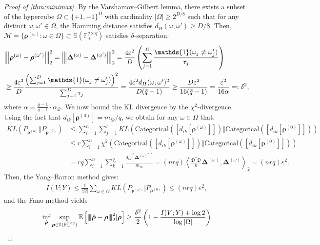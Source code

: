 \documentclass[noinfoline]{imsart}\setcounter{tocdepth}{2}
\renewcommand{\b}[1]{\mathbb{#1}} %
\newcommand{\f}[1]{\mathfrak{#1}} %
\renewcommand{\c}[1]{\mathcal{#1}} %
\newcommand{\ds}[1]{\mathds{#1}} %
\newcommand{\mb}[1]{\boldsymbol{#1}} %
\newcommand{\vertiii}[1]{{\left\vert\kern-0.25ex\left\vert\kern-0.25ex\left\vert #1 
    \right\vert\kern-0.25ex\right\vert\kern-0.25ex\right\vert}} %
\newcommand{\innpr}[2]{{\left\langle {#1},{#2}\right\rangle}} %
\theoremstyle{plain}
\begin{document}
\begin{appendix}
\begin{proof}[Proof of \cref{thm:minimax}]
By the Varshamov--Gilbert lemma, there exists a subset of the hypercube $\Omega \subset \{+1, -1\}^{D}$ with cardinality $|\Omega| \ge 2^{D/8}$ such that for any distinct $\omega, \omega' \in \Omega$, the Hamming distance satisfies $d_{H}(\omega, \omega') \ge D/8$. Then, $\c{M} = \{\mb{\rho}^{(\omega)} : \omega \in \Omega \} \subset \b{S}(\b{F}_{+}^{q \times q})$ satisfies $\delta$-separation:
\begin{align*}
    &\vertiii{\mb{\rho}^{(\omega)} - \mb{\rho}^{(\omega')}}_{2}^{2} = \vertiii{\mb{\Delta}^{(\omega)} - \mb{\Delta}^{(\omega')}}_{2}^{2} = \frac{4 \varepsilon^{2}}{D} \left( \sum_{j=1}^{D} \frac{\ds{1}(\omega_{j} \neq \omega_{j}')}{ \tau_{j}} \right) \\
    &\ge \frac{4 \varepsilon^{2}}{D} \frac{ \left( \sum_{j=1}^{D} \ds{1}(\omega_{j} \neq \omega_{j}') \right)^{2}}{\sum_{j=1}^{D} \tau_{j}} = \frac{4 \varepsilon^2 d_{H}(\omega, \omega')^{2}}{D (\bar{q}-1)} \ge  \frac{D \varepsilon^2}{16 (\bar{q}-1)} = \frac{\varepsilon^2}{16 \alpha} =: \delta^{2},
\end{align*}
where $\alpha = \frac{\bar{q} - 1}{q-1} \cdot \alpha_{\c{Q}}$.
We now bound the KL divergence by the $\chi^{2}$-divergence. Using the fact that $d_{ik}[\mb{\rho}^{(0)}] = m_{ik} / q$, we obtain for any $\omega \in \Omega$ that:
\begin{align*}
    KL(P_{\mb{\rho}^{(\omega)}} \Vert P_{\mb{\rho}^{(0)}}) &\le \sum_{i=1}^{n} \sum_{j=1}^{r} KL( \mathrm{Categorical}([d_{ik}[\mb{\rho}^{(\omega)}]]) \Vert \mathrm{Categorical}([d_{ik}[\mb{\rho}^{(0)}]]) ) \\
    &\le r \sum_{i=1}^{n} \chi^{2}( \mathrm{Categorical}([d_{ik}[\mb{\rho}^{(\omega)}]]) \Vert \mathrm{Categorical}([d_{ik}[\mb{\rho}^{(0)}]]) ) \\
    &= rq \sum_{i=1}^{n} \sum_{k=1}^{q_{i}} \frac{d_{ik}[\mb{\Delta}^{(\omega)}]^{2}}{m_{ik}} = (n rq ) \innpr{\frac{\f{D}^{*} \f{D}}{n} \mb{\Delta}^{(\omega)}}{\mb{\Delta}^{(\omega)}}_{2} = (nrq) \varepsilon^{2}.
\end{align*}
Then, the Yang--Barron method \cite{yang1999information} gives:
\begin{align*}
    I(V ; Y) \le \frac{1}{|\Omega|} \sum_{\omega \in \Omega} KL(P_{\mb{\rho}^{(\omega)}} \Vert P_{\mb{\rho}^{(0)}}) \le (nrq) \varepsilon^{2},
\end{align*}
and the Fano method yields
\begin{align*}
    \inf_{\hat{\mb{\rho}}} \sup_{\mb{\rho} \in \b{S}(\b{F}_{+}^{q \times q})} \b{E} \left[\vertiii{\hat{\mb{\rho}} - \mb{\rho}}_{2}^{2} \vert \mb{\rho} \right] &\ge \frac{\delta^{2}}{2} \left(1 - \frac{I(V; Y) + \log 2}{\log |\Omega|} \right) \\

\end{align*}
\end{proof}
\end{appendix}
\end{document}
